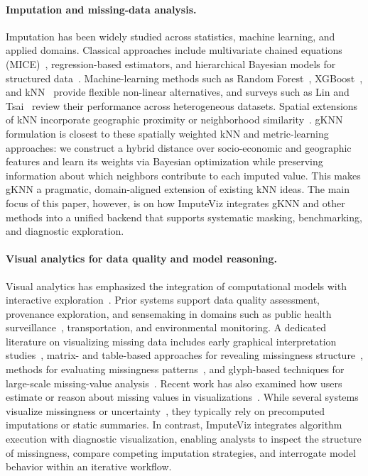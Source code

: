 \documentclass[review]{vgtc}
\newcommand{\gknn}{gKNN\xspace}
\newcommand{\mice}{MICE\xspace}
\newcommand{\tool}{ImputeViz\xspace}
\begin{document}
\paragraph*{Imputation and missing-data analysis.}
Imputation has been widely studied across statistics, machine learning, and applied domains. Classical approaches include multivariate chained equations (\mice)~\cite{VanBuuren2018MICE}, regression-based estimators, and hierarchical Bayesian models for structured data~\cite{Waller2016BayesianSmallArea}. Machine-learning methods such as Random Forest~\cite{Breiman2001RandomForest}, XGBoost~\cite{Chen2016XGBoost}, and kNN~\cite{Cover1967KNN} provide flexible non-linear alternatives, and surveys such as Lin and Tsai~\cite{lin2020missing} review their performance across heterogeneous datasets. Spatial extensions of kNN incorporate geographic proximity or neighborhood similarity~\cite{baker2014missing}. \gknn formulation is closest to these spatially weighted kNN and metric-learning approaches: we construct a hybrid distance over socio-economic and geographic features and learn its weights via Bayesian optimization \cite{snoek2012practical} while preserving information about which neighbors contribute to each imputed value. This makes gKNN a pragmatic, domain-aligned extension of existing kNN ideas. The main focus of this paper, however, is on how ImputeViz integrates gKNN and other methods into a unified backend that supports systematic masking, benchmarking, and diagnostic exploration.

\paragraph*{Visual analytics for data quality and model reasoning.}
Visual analytics has emphasized the integration of computational models with interactive exploration~\cite{Endert2017}. Prior systems support data quality assessment, provenance exploration, and sensemaking in domains such as public health surveillance~\cite{sankaran2016opioid, Carroll2014HealthVis}, transportation, and environmental monitoring. A dedicated literature on visualizing missing data includes early graphical interpretation studies~\cite{eaton2005visualizing}, matrix- and table-based approaches for revealing missingness structure~\cite{fernstad2014visual}, methods for evaluating missingness patterns~\cite{fernstad2019identify}, and glyph-based techniques for large-scale missing-value analysis~\cite{fernstad2021explore}. Recent work has also examined how users estimate or reason about missing values in visualizations~\cite{sun2024investigating}. While several systems visualize missingness or uncertainty~\cite{Sacha2016UncertaintyTrust}, they typically rely on precomputed imputations or static summaries. In contrast, \tool integrates algorithm execution with diagnostic visualization, enabling analysts to inspect the structure of missingness, compare competing imputation strategies, and interrogate model behavior within an iterative workflow.
\end{document}
